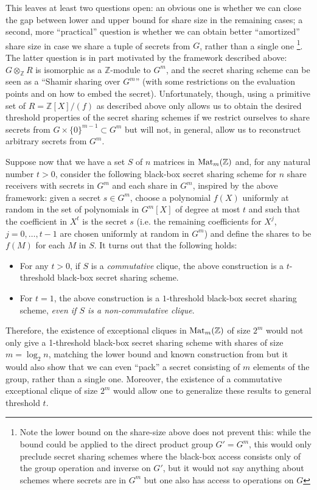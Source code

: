 \documentclass{amsart}
\theoremstyle{plain}
\theoremstyle{definition}
\newcommand{\Z}{\ensuremath{\mathbb{Z}}}
\begin{document}
This leaves at least two questions open: an obvious one is whether we can close the gap between lower and upper bound for share size in the remaining cases; a second, more ``practical'' question is whether we can obtain better ``amortized'' share size in case we share a tuple of secrets from $G$, rather than a single one \footnote{Note the lower bound on the share-size above does not prevent this: while the bound could be applied to the direct product group $G'=G^m$, this would only preclude secret sharing schemes where the black-box access consists only of the group operation and inverse on $G'$, but it would not say anything about schemes where secrets are in $G^m$ but one also has access to operations on $G$}. The latter question is in part motivated by the framework described above: $G\otimes_{\Z} R$ is isomorphic as a $\Z$-module to $G^m$, and the secret sharing scheme can be seen as a ``Shamir sharing over $G^m$'' (with some restrictions on the evaluation points and on how to embed the secret). Unfortunately, though, using a primitive set of $R=\Z[X]/(f)$ as described above only allows us to obtain the desired threshold properties of the secret sharing schemes if we restrict ourselves to share secrets from $G\times \{0\}^{m-1}\subset G^m$ but will not, in general, allow us to reconstruct arbitrary secrets from $G^m$.

Suppose now that we have a set $S$ of $n$ matrices in $\textup{Mat}_m(\Z)$ and, for any natural number $t>0$, consider the following black-box secret sharing scheme for $n$ share receivers with secrets in $G^m$ and each share in $G^m$, inspired by the above framework: given a secret $s\in G^m$, choose a polynomial $f(X)$ uniformly at random in the set of polynomials in $G^m[X]$ of degree at most $t$ and such that the coefficient in $X^t$ is the secret $s$ (i.e. the remaining coefficients for $X^j$, $j=0,\dots, t-1$ are chosen uniformly at random in $G^m$) and define the shares to be $f(M)$ for each $M$ in $S$.
It turns out that the following holds:
\begin{itemize}
	\item For any $t>0$, if $S$ is a \textit{commutative} clique, the above construction is a $t$-threshold black-box secret sharing scheme. 
	\item For $t=1$, the above construction is a $1$-threshold black-box secret sharing scheme, \emph{even if $S$ is a non-commutative clique}.
\end{itemize} 

Therefore, the existence of exceptional cliques in $\textup{Mat}_m(\Z)$ of size $2^m$ would not only give a 1-threshold black-box secret sharing scheme with shares of size $m=\log_2 n$, matching the lower bound and known construction from \cite{CFS05} but it would also show that we can even ``pack'' a secret consisting of $m$ elements of the group, rather than a single one.
Moreover, the existence of a commutative exceptional clique of size $2^m$ would allow one to generalize these results to general threshold $t$.\\ 
\end{document}
